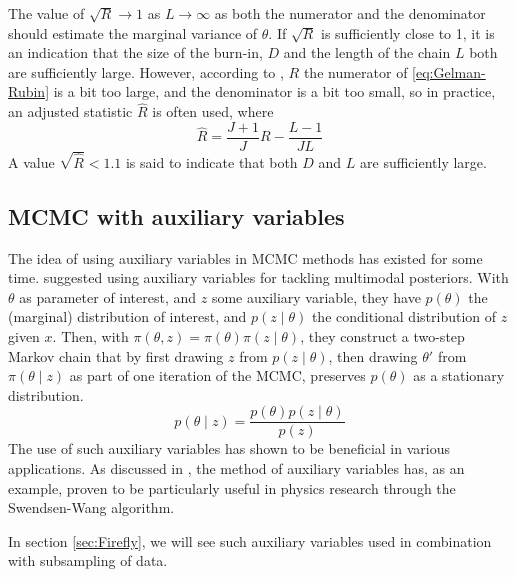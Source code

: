 The value of $\sqrt{R} \xrightarrow{} 1$ as $L \xrightarrow{} \infty$ as both the numerator and the denominator should estimate the marginal variance of $\theta$. If $\sqrt{R}$ is sufficiently close to 1, it is an indication that the size of the burn-in, $D$ and the length of the chain $L$ both are sufficiently large. However, according to \cite{CS}, $R$ the numerator of \eqref{eq:Gelman-Rubin} is a bit too large, and the denominator is a bit too small, so in practice, an adjusted statistic $\hat{R}$ is often used, where
\begin{equation}\label{eq:Gelman-Rubin_adjusted}
    \hat{R} = \frac{J+1}{J}R - \frac{L-1}{JL} 
\end{equation}
A value $\sqrt{\hat{R}}<1.1$ is said to indicate that both $D$ and $L$ are sufficiently large.

\subsection{MCMC with auxiliary variables}
The idea of using auxiliary variables in MCMC methods has existed for some time. 
\cite{Besag} suggested using auxiliary variables for tackling multimodal posteriors.
With $\theta$ as parameter of interest, and $z$ some auxiliary variable, they have $p\left(\theta\right)$ the (marginal) distribution of interest, and $p\left(z\mid\theta\right)$ the conditional distribution of $z$ given $x$. 
Then, with $\pi\left(\theta, z\right) = \pi\left(\theta\right)\pi\left(z\mid\theta\right)$, they construct a two-step Markov chain that by  
first drawing $z$ from $p\left(z\mid \theta\right)$, then drawing $\theta'$ from $\pi\left(\theta\mid z\right)$ as part of one iteration of the MCMC, preserves $p\left(\theta\right)$ as a stationary distribution. 
$$p\left(\theta\mid z\right) = \frac{p\left(\theta\right) p\left(z\mid\theta\right)}{p\left(z\right)}$$
The use of such auxiliary variables has shown to be beneficial in various applications. 
As discussed in \cite{Besag}, the method of auxiliary variables has, as an example, proven to be particularly useful in physics research through the Swendsen-Wang algorithm. 

In section \ref{sec:Firefly}, we will see such auxiliary variables used in combination with subsampling of data.
